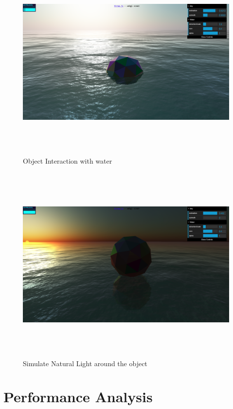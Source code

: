 \documentclass[BTech]{srmuthesis}
\begin{document}
\begin{figure}[htbp]
	\centering
	\includegraphics[width=\linewidth, height=10cm,keepaspectratio]{render}
	\caption{Object Interaction with water}
	\label{fig:arch}
\end{figure}
\begin{figure}[htbp]
	\centering
	\includegraphics[width=\linewidth, height=10cm,keepaspectratio]{render2}
	\caption{Simulate Natural Light around the object}
	\label{fig:arch}
\end{figure}

\section{Performance Analysis}
\end{document}
